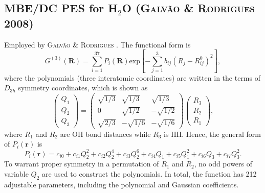 \documentclass[12pt]{article}
\begin{document}
\subsection{MBE/DC PES for H$_2$O (\textsc{Galvão \& Rodrigues} 2008)}
\label{submbedc}
Employed by \textsc{Galvão \& Rodrigues} \cite{idx148}. The functional form is
\begin{equation}
    G^{(3)}(\mathbf{R}) = \sum_{i=1}^{37}P_i(\mathbf{R})\text{exp}\left[-\sum_{j=1}^3b_{ij}(R_j-R_{ij}^0)^2\right],
\end{equation}
where the polynomials (three interatomic coordinates) are written in the terms of $D_{3h}$ symmetry coordinates, which is shown as
\begin{equation}
    \begin{pmatrix}
        Q_1 \\
        Q_2 \\
        Q_3
    \end{pmatrix}
    = 
    \begin{pmatrix}
        \sqrt{1/3} & \sqrt{1/3} & \sqrt{1/3} \\
        0 & \sqrt{1/2} & -\sqrt{1/2} \\
        \sqrt{2/3} & -\sqrt{1/6} & -\sqrt{1/6}
    \end{pmatrix}
    \begin{pmatrix}
        R_3 \\
        R_2 \\
        R_1
    \end{pmatrix},
    \label{eqmbedcd3h}
\end{equation}
where $R_1$ and $R_2$ are OH bond distances while $R_3$ is HH. Hence, the general form of $P_i(\mathbf{r})$ is
\begin{equation}
    P_i(\mathbf{r}) = c_{i0} + c_{i1}Q_2^2 + c_{i2}Q_2^4 + c_{i3}Q_2^6 + c_{i4}Q_1 + c_{i5}Q_1^2 + c_{i6}Q_3 + c_{i7}Q_3^2.
\label{eqmbedcpolynom}
\end{equation}
To warrant proper symmetry in a permutation of $R_1$ and $R_2$, no odd powers of variable $Q_2$ are used to construct the polynomials.
In total, the function has 212 adjustable parameters, including the polynomial and Gaussian coefficients.
\end{document}
